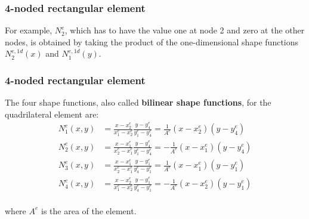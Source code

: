 \documentclass[notes]{beamer}
\begin{document}
\begin{frame}
\frametitle{4-noded rectangular element}
For example, $N_2^e$, which has to have the value one at node 2 and zero at the other nodes,
is obtained by taking the product of the one-dimensional shape functions $N_2^{e,1d}(x)$ and 
$N_1^{e,1d}(y)$.

\end{frame}


\begin{frame}
\frametitle{4-noded rectangular element}

The four shape functions, also called \textbf{bilinear shape functions}, for the quadrilateral element are:
\begin{align*}
	N_1^e (x, y) & = \frac{x - x_2^e}{x_1^e - x_2^e}\frac{y - y_4^e}{y_1^e - y_4^e} = \frac{1}{A^e}(x - x_2^e)(y - y_4^e) \\
	N_2^e (x, y) & = \frac{x - x_1^e}{x_2^e - x_1^e}\frac{y - y_4^e}{y_1^e - y_4^e} = -\frac{1}{A^e}(x - x_1^e)(y - y_4^e) \\
	N_3^e (x, y) & = \frac{x - x_1^e}{x_2^e - x_1^e}\frac{y - y_1^e}{y_4^e - y_1^e} = \frac{1}{A^e}(x - x_1^e)(y - y_1^e) \\
	N_4^e (x, y) & = \frac{x - x_2^e}{x_1^e - x_2^e}\frac{y - y_1^e}{y_4^e - y_1^e} = -\frac{1}{A^e}(x - x_2^e)(y - y_1^e)\\
\end{align*}

where $A^e$ is the area of the element.

\end{frame}
\end{document}
